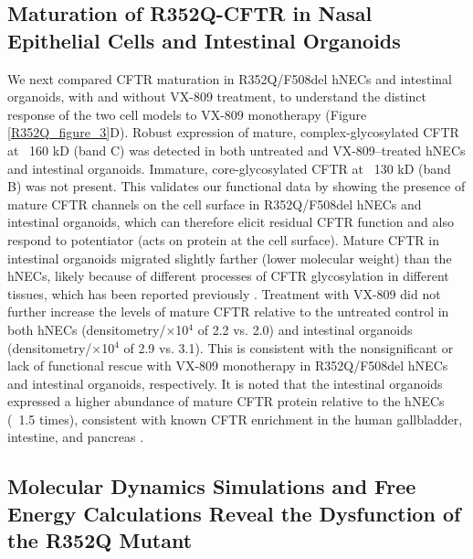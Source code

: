 \subsection{Maturation of R352Q-CFTR in Nasal Epithelial Cells and Intestinal Organoids}

We next compared CFTR maturation in R352Q/F508del hNECs and intestinal organoids, with and without VX-809 treatment, to understand the distinct response of the two cell models to VX-809 monotherapy (Figure \ref{R352Q_figure_3}D). Robust expression of mature, complex-glycosylated CFTR at ~160 kD (band C) was detected in both untreated and VX-809–treated hNECs and intestinal organoids. Immature, core-glycosylated CFTR at ~130 kD (band B) was not present. This validates our functional data by showing the presence of mature CFTR channels on the cell surface in R352Q/F508del hNECs and intestinal organoids, which can therefore elicit residual CFTR function and also respond to potentiator (acts on protein at the cell surface). Mature CFTR in intestinal organoids migrated slightly farther (lower molecular weight) than the hNECs, likely because of different processes of CFTR glycosylation in different tissues, which has been reported previously \cite{vanbarneveld2010}. Treatment with VX-809 did not further increase the levels of mature CFTR relative to the untreated control in both hNECs (densitometry/×10$^4$ of 2.2 vs. 2.0) and intestinal organoids (densitometry/×10$^4$ of 2.9 vs. 3.1). This is consistent with the nonsignificant or lack of functional rescue with VX-809 monotherapy in R352Q/F508del hNECs and intestinal organoids, respectively. It is noted that the intestinal organoids expressed a higher abundance of mature CFTR protein relative to the hNECs (~1.5 times), consistent with known CFTR enrichment in the human gallbladder, intestine, and pancreas \cite{human_protein_atlas_2021, uhlen2015}.

\subsection{Molecular Dynamics Simulations and Free Energy Calculations Reveal the Dysfunction of the R352Q Mutant}

